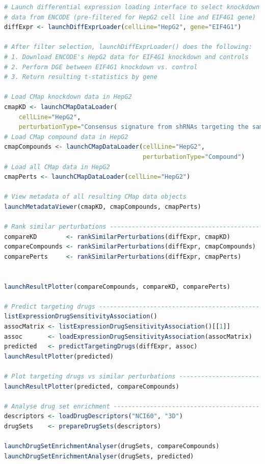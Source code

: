 \begin{lstlisting}[language=R,morekeywords={include, launchDiffExprLoader},keywordstyle=\bfseries]
# Launch differential expression loading interface to select knockdown
# data from ENCODE (pre-filtered for HepG2 cell line and EIF4G1 gene)
diffExpr <- launchDiffExprLoader(cellLine="HepG2", gene="EIF4G1")

# After filter selection, launchDiffExprLoader() does the following:
# 1. Download ENCODE's HepG2 data for EIF4G1 knockdown and controls
# 2. Perform DGE between EIF4G1 knockdown vs. control
# 3. Return resulting t-statistics by gene

# Load CMap knockdown data in HepG2
cmapKD <- launchCMapDataLoader(
    cellLine="HepG2",
    perturbationType="Consensus signature from shRNAs targeting the same gene")
# Load CMap compound data in HepG2
cmapCompounds <- launchCMapDataLoader(cellLine="HepG2",
                                      perturbationType="Compound")
# Load all CMap data in HepG2
cmapPerts <- launchCMapDataLoader(cellLine="HepG2")

# View metadata of all resulting CMap data objects
launchMetadataViewer(cmapKD, cmapCompounds, cmapPerts)

# Rank similar perturbations -----------------------------------------
compareKD        <- rankSimilarPerturbations(diffExpr, cmapKD)
compareCompounds <- rankSimilarPerturbations(diffExpr, cmapCompounds)
comparePerts     <- rankSimilarPerturbations(diffExpr, cmapPerts)


launchResultPlotter(compareCompounds, compareKD, comparePerts)

# Predict targeting drugs --------------------------------------------
listExpressionDrugSensitivityAssociation()
assocMatrix <- listExpressionDrugSensitivityAssociation()[[1]]
assoc       <- loadExpressionDrugSensitivityAssociation(assocMatrix)
predicted   <- predictTargetingDrugs(diffExpr, assoc)
launchResultPlotter(predicted)

# Plot targeting drugs vs similar perturbations ----------------------
launchResultPlotter(predicted, compareCompounds)

# Analyse drug set enrichment ----------------------------------------
descriptors <- loadDrugDescriptors("NCI60", "3D")
drugSets    <- prepareDrugSets(descriptors)

launchDrugSetEnrichmentAnalyser(drugSets, compareCompounds)
launchDrugSetEnrichmentAnalyser(drugSets, predicted)
\end{lstlisting}

